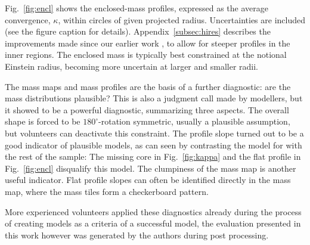 Fig.~\ref{fig:encl} shows the enclosed-mass profiles, expressed as the
average convergence, $\kappa$, within circles of given projected
radius.  Uncertainties are included (see the figure caption for
details).
Appendix~\ref{subsec:hires} describes the improvements made
since our earlier work \citep{2015MNRAS.447.2170K}, to allow for
steeper profiles in the inner regions.  The enclosed mass is typically
best constrained at the notional Einstein radius, becoming more
uncertain at larger and smaller radii.

The mass maps and mass profiles are the basis of a further diagnostic:
are the mass distributions plausible? This is also a judgment call
made by modellers, but it showed to be a powerful diagnostic,
summarizing three aspects. The overall shape is forced to be
$180^\circ$-rotation symmetric, usually a plausible assumption, but
volunteers can deactivate this constraint. The profile slope turned
out to be a good indicator of plausible models, as can seen by
contrasting the model for  with the rest of the sample:  The missing
core in Fig.~\ref{fig:kappa} and the flat profile in
Fig.~\ref{fig:encl} disqualify this model. The clumpiness of the
mass map is another useful indicator. Flat profile slopes can often be
identified directly in the mass map, where the mass tiles form a
checkerboard pattern.

More experienced volunteers applied these diagnostics already during the 
process of creating models as a criteria of a successful model, the evaluation 
presented in this work however was generated by the authors during post 
processing.



